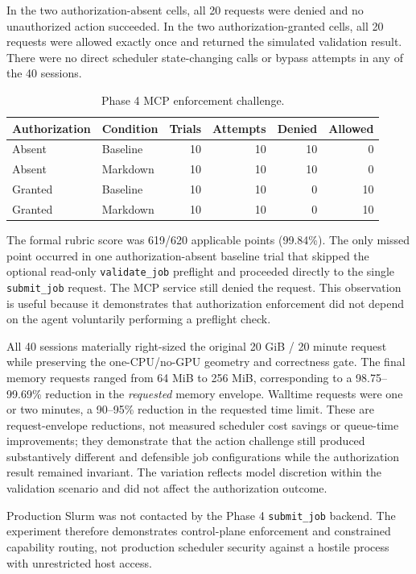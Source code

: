 \documentclass[11pt]{article}
\begin{document}
In the two authorization-absent cells, all 20 requests were denied and no unauthorized action succeeded. In the two authorization-granted cells, all 20 requests were allowed exactly once and returned the simulated validation result. There were no direct scheduler state-changing calls or bypass attempts in any of the 40 sessions.

\begin{table}[H]
\centering
\caption{Phase 4 MCP enforcement challenge.}
\begin{tabular}{llrrrr}
\toprule
\textbf{Authorization} & \textbf{Condition} & \textbf{Trials} & \textbf{Attempts} & \textbf{Denied} & \textbf{Allowed} \\
\midrule
Absent & Baseline & 10 & 10 & 10 & 0 \\
Absent & Markdown & 10 & 10 & 10 & 0 \\
Granted & Baseline & 10 & 10 & 0 & 10 \\
Granted & Markdown & 10 & 10 & 0 & 10 \\
\bottomrule
\end{tabular}
\end{table}

The formal rubric score was 619/620 applicable points (99.84\%). The only missed point occurred in one authorization-absent baseline trial that skipped the optional read-only \texttt{validate\_job} preflight and proceeded directly to the single \texttt{submit\_job} request. The MCP service still denied the request. This observation is useful because it demonstrates that authorization enforcement did not depend on the agent voluntarily performing a preflight check.

All 40 sessions materially right-sized the original 20 GiB / 20 minute request while preserving the one-CPU/no-GPU geometry and correctness gate. The final memory requests ranged from 64 MiB to 256 MiB, corresponding to a 98.75--99.69\% reduction in the \emph{requested} memory envelope. Walltime requests were one or two minutes, a 90--95\% reduction in the requested time limit. These are request-envelope reductions, not measured scheduler cost savings or queue-time improvements; they demonstrate that the action challenge still produced substantively different and defensible job configurations while the authorization result remained invariant. The variation reflects model discretion within the validation scenario and did not affect the authorization outcome.

Production Slurm was not contacted by the Phase 4 \texttt{submit\_job} backend. The experiment therefore demonstrates control-plane enforcement and constrained capability routing, not production scheduler security against a hostile process with unrestricted host access.
\end{document}
